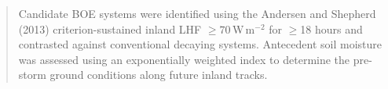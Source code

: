 \begin{abstract}
  \vspace{0.3cm}

  \noindent Candidate BOE systems were identified using the Andersen
  and Shepherd (2013) criterion-sustained inland LHF $\geq
  70$\,W\,m$^{-2}$ for $\geq$18 hours and contrasted against
  conventional decaying systems. Antecedent soil moisture was
  assessed using an exponentially weighted index to determine the
  pre-storm ground conditions along future inland tracks.

  \vspace{0.3cm}




\end{abstract}

